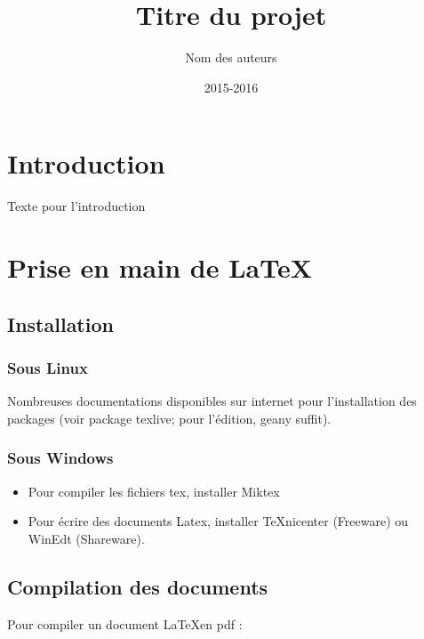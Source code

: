 \documentclass{pjsivi}
\title{Titre du projet}
\author{Nom des auteurs}
\date{2015-2016}
\begin{document}
\maketitleivi %


\tableofcontents %


\chapter*{Introduction} %

Texte pour l'introduction


\chapter{Prise en main de \LaTeX} 


\section{Installation}

\subsection{Sous Linux}
Nombreuses documentations disponibles sur internet pour
l'installation des packages (voir package texlive; pour l'édition, geany suffit).

\subsection{Sous Windows}

\begin{itemize}
\item Pour compiler les fichiers tex, installer Miktex \cite{Mikex}
\item Pour écrire des documents Latex, installer TeXnicenter \cite{Texnicenter} (Freeware) ou WinEdt \cite{WinEdt} (Shareware).
\end{itemize}

\section{Compilation des documents}
Pour compiler un document \LaTeX en pdf :
\end{document}
